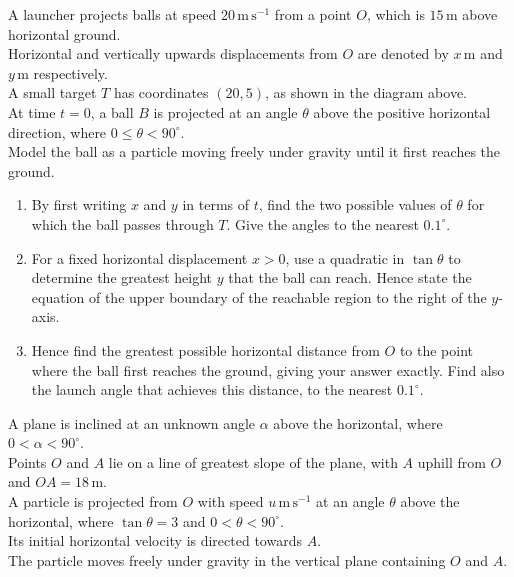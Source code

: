 \documentclass[leqno]{article}
\begin{document}
\begin{enumerate}[
  label=\textbf{\arabic*.},
  leftmargin=*,
  topsep=0pt,
  partopsep=0pt,
  parsep=0pt
]
A launcher projects balls at speed $20\,\mathrm{m\,s^{-1}}$ from a point $O$, which is $15\,\mathrm{m}$ above horizontal ground. \\
Horizontal and vertically upwards displacements from $O$ are denoted by $x\,\mathrm{m}$ and $y\,\mathrm{m}$ respectively. \\
A small target $T$ has coordinates $(20,5)$, as shown in the diagram above. \\

At time $t=0$, a ball $B$ is projected at an angle $\theta$ above the positive horizontal direction, where $0\leq\theta<90^\circ$. \\
Model the ball as a particle moving freely under gravity until it first reaches the ground. \\

\begin{enumerate}[label=\textbf{(\alph*)}]
\item By first writing $x$ and $y$ in terms of $t$, find the two possible values of $\theta$ for which the ball passes through $T$. Give the angles to the nearest $0.1^\circ$.  \\
\item For a fixed horizontal displacement $x>0$, use a quadratic in $\tan\theta$ to determine the greatest height $y$ that the ball can reach. Hence state the equation of the upper boundary of the reachable region to the right of the $y$-axis.  \\
\item Hence find the greatest possible horizontal distance from $O$ to the point where the ball first reaches the ground, giving your answer exactly. Find also the launch angle that achieves this distance, to the nearest $0.1^\circ$.  \\
\end{enumerate}

\newpage

\questionitem

A plane is inclined at an unknown angle $\alpha$ above the horizontal, where $0<\alpha<90^\circ$. \\
Points $O$ and $A$ lie on a line of greatest slope of the plane, with $A$ uphill from $O$ and $OA=18\,\mathrm{m}$. \\

A particle is projected from $O$ with speed $u\,\mathrm{m\,s^{-1}}$ at an angle $\theta$ above the horizontal, where $\tan\theta=3$ and $0<\theta<90^\circ$. \\
Its initial horizontal velocity is directed towards $A$. \\
The particle moves freely under gravity in the vertical plane containing $O$ and $A$. \\


\end{enumerate}
\end{document}
